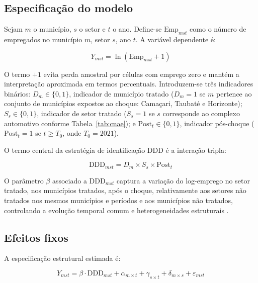 \documentclass[12pt,a4paper]{article}
\begin{document}
\subsection{Especifica\c{c}\~ao do modelo}
\label{sub:modelo}

Sejam $m$ o munic\'ipio, $s$ o setor e $t$ o ano. Define-se $\text{Emp}_{mst}$ como o n\'umero de empregados no munic\'ipio $m$, setor $s$, ano $t$. A vari\'avel dependente \'e:

\begin{equation}
Y_{mst} = \ln(\text{Emp}_{mst} + 1)
\label{eq:outcome}
\end{equation}

O termo $+1$ evita perda amostral por c\'elulas com emprego zero e mant\'em a interpreta\c{c}\~ao aproximada em termos percentuais. Introduzem-se tr\^es indicadores bin\'arios: $D_m \in \{0,1\}$, indicador de munic\'ipio tratado ($D_m = 1$ se $m$ pertence ao conjunto de munic\'ipios expostos ao choque: Cama\c{c}ari, Taubat\'e e Horizonte); $S_s \in \{0,1\}$, indicador de setor tratado ($S_s = 1$ se $s$ corresponde ao complexo automotivo conforme Tabela~\ref{tab:cnae}); e $\text{Post}_t \in \{0,1\}$, indicador p\'os-choque ($\text{Post}_t = 1$ se $t \geq T_0$, onde $T_0 = 2021$).

O termo central da estrat\'egia de identifica\c{c}\~ao DDD \'e a intera\c{c}\~ao tripla:

\begin{equation}
\text{DDD}_{mst} = D_m \times S_s \times \text{Post}_t
\label{eq:ddd}
\end{equation}

O par\^ametro $\beta$ associado a $\text{DDD}_{mst}$ captura a varia\c{c}\~ao do log-emprego no setor tratado, nos munic\'ipios tratados, ap\'os o choque, relativamente aos setores n\~ao tratados nos mesmos munic\'ipios e per\'iodos e aos munic\'ipios n\~ao tratados, controlando a evolu\c{c}\~ao temporal comum e heterogeneidades estruturais \parencite{olden2022}.

\subsection{Efeitos fixos}
\label{sub:fe}

A especifica\c{c}\~ao estrutural estimada \'e:

\begin{equation}
Y_{mst} = \beta \cdot \text{DDD}_{mst} + \alpha_{m \times t} + \gamma_{s \times t}
  + \delta_{m \times s} + \varepsilon_{mst}
\label{eq:main}
\end{equation}
\end{document}
